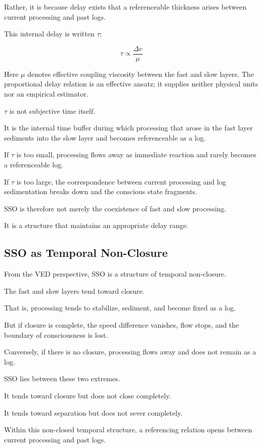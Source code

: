Rather, it is because delay exists that a referenceable thickness arises between current processing and past logs.

This internal delay is written $\tau$:

\begin{equation}
\tau \propto \frac{\Delta v}{\mu}
\end{equation}

Here $\mu$ denotes effective coupling viscosity between the fast and slow layers. The proportional delay relation is an effective ansatz; it supplies neither physical units nor an empirical estimator.

$\tau$ is not subjective time itself.

It is the internal time buffer during which processing that arose in the fast layer sediments into the slow layer and becomes referenceable as a log.

If $\tau$ is too small, processing flows away as immediate reaction and rarely becomes a referenceable log.

If $\tau$ is too large, the correspondence between current processing and log sedimentation breaks down and the conscious state fragments.

SSO is therefore not merely the coexistence of fast and slow processing.

It is a structure that maintains an appropriate delay range.

\subsection{SSO as Temporal Non-Closure}


From the VED perspective, SSO is a structure of temporal non-closure.

The fast and slow layers tend toward closure.

That is, processing tends to stabilize, sediment, and become fixed as a log.

But if closure is complete, the speed difference vanishes, flow stops, and the boundary of consciousness is lost.

Conversely, if there is no closure, processing flows away and does not remain as a log.

SSO lies between these two extremes.

It tends toward closure but does not close completely.

It tends toward separation but does not sever completely.

Within this non-closed temporal structure, a referencing relation opens between current processing and past logs.

